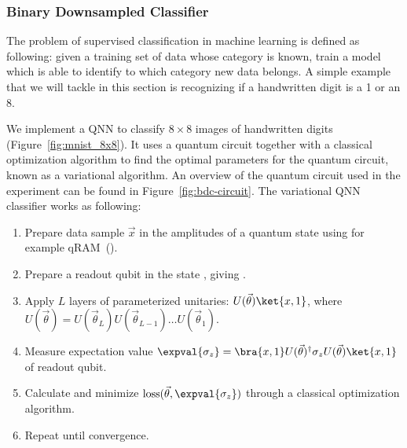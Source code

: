 \documentclass[a4paper,10pt]{article}
\DeclareMathOperator{\loss}{loss}
\begin{document}
\subsubsection{Binary Downsampled Classifier}
The problem of supervised classification in machine learning is defined as following: given a training set of data whose category is known, train a model which is able to identify to which category new data belongs.
A simple example that we will tackle in this section is recognizing if a handwritten digit is a 1 or an 8.

We implement a QNN to classify $8 \times 8$ images of handwritten digits (Figure~\ref{fig:mnist_8x8}).
It uses a quantum circuit together with a classical optimization algorithm to find the optimal parameters for the quantum circuit, known as a variational algorithm.
An overview of the quantum circuit used in the experiment can be found in Figure~\ref{fig:bdc-circuit}.
The variational QNN classifier works as following:
\begin{enumerate}
	\item Prepare data sample $\vec{x}$ in the amplitudes of a quantum state  using for example qRAM~(\cite{qram}).
	\item Prepare a readout qubit in the state , giving .
	\item Apply $L$ layers of parameterized unitaries: $U(\vec{\theta})\ket{x, 1}$, where $U(\vec{\theta}) = U(\vec{\theta}_L) U(\vec{\theta}_{L-1}) \ldots U(\vec{\theta}_1)$.
	\item Measure expectation value $\expval{\sigma_z} = \bra{x, 1}U(\vec{\theta})^\dagger \sigma_z U(\vec{\theta})\ket{x, 1}$ of readout qubit.
	\item Calculate and minimize $\loss(\vec{\theta}, \expval{\sigma_z})$ through a classical optimization algorithm.
	\item Repeat until convergence.
\end{enumerate}
\end{document}
